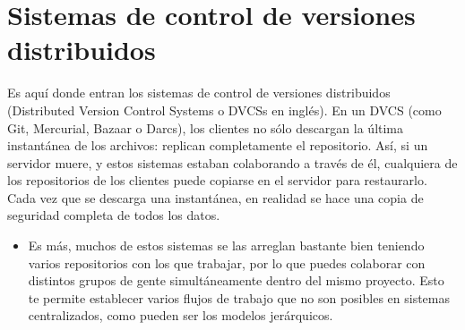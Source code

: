\section{Sistemas de control de versiones distribuidos} 
Es aquí donde entran los sistemas de control de versiones distribuidos (Distributed Version Control Systems o DVCSs en inglés). En un DVCS (como Git, Mercurial, Bazaar o Darcs), los clientes no sólo descargan la última instantánea de los archivos: replican completamente el repositorio. Así, si un servidor muere, y estos sistemas estaban colaborando a través de él, cualquiera de los repositorios de los clientes puede copiarse en el servidor para restaurarlo. Cada vez que se descarga una instantánea, en realidad se hace una copia de seguridad completa de todos los datos.

\begin{itemize}
	\begin{center}
	\texttt{[image: ./Imagenes/imagen5]} 
	\end{center}

	\item Es más, muchos de estos sistemas se las arreglan bastante bien teniendo varios repositorios con los que trabajar, por lo que puedes colaborar con distintos grupos de gente simultáneamente dentro del mismo proyecto. Esto te permite establecer varios flujos de trabajo que no son posibles en sistemas centralizados, como pueden ser los modelos jerárquicos.



\end{itemize} 